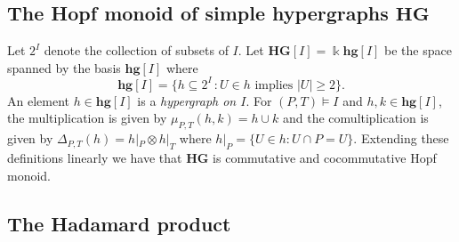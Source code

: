 \documentclass[ALCO,ThmDefs,Unicode,epreuves]{cedram}
\def\field{\Bbbk}
\newcommand{\bH}{\mathbf{H}}
\newcommand{\bPi}{\bpi}
\newcommand{\bG}{\mathbf{G}}
\newcommand{\bpi}{\boldsymbol \pi}
\begin{document}
\subsection{The Hopf monoid of simple hypergraphs \texorpdfstring{$\mathbf{HG}$}{HG}}\label{ss:hypergraph}

Let $2^I$ denote the collection of subsets of $I$. Let $\mathbf{HG} [I]=\field {\mathbf{hg}} [I]$ be the space spanned by the basis $\mathbf{hg} [I]$ where
 $$\mathbf{hg}[I]=\big\{h \subseteq 2^I\,: U\in h\text{ implies }|U|\ge 2\big\}.$$
An element $h\in\mathbf{hg}[I]$ is a \emph{hypergraph on $I$}.
For $(P,T)\models I$ and $h,k\in \mathbf{hg}[I]$, the multiplication is given by $\mu_{P,T}(h,k)=h\cup k$ and the comultiplication 
is given by $\Delta_{P,T}(h) = h |_P\otimes h |_T$ where $h |_P=\{U\in h : U\cap P = U\}$. Extending these definitions linearly we have that $\mathbf{HG}$ is 
commutative and cocommutative Hopf monoid. 

%

\subsection{The Hadamard product}\label{ss:hadamard}
\end{document}
